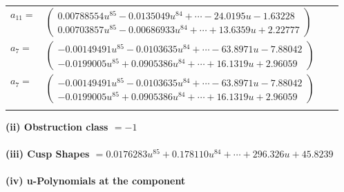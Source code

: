 \documentclass[1p]{elsarticle_modified}
\theoremstyle{definition}
\begin{document}
\begin{tabular}{m{7pt} m{180pt} m{7pt} m{180pt} }
\flushright $a_{11}=$&$\begin{pmatrix}0.00788554 u^{85}-0.0135049 u^{84}+\cdots-24.0195 u-1.63228\\0.00703857 u^{85}-0.00686933 u^{84}+\cdots+13.6359 u+2.22777\end{pmatrix}$ \\
\flushright $a_{7}=$&$\begin{pmatrix}-0.00149491 u^{85}-0.0103635 u^{84}+\cdots-63.8971 u-7.88042\\-0.0199005 u^{85}+0.0905386 u^{84}+\cdots+16.1319 u+2.96059\end{pmatrix}$\\ \flushright $a_{7}=$&$\begin{pmatrix}-0.00149491 u^{85}-0.0103635 u^{84}+\cdots-63.8971 u-7.88042\\-0.0199005 u^{85}+0.0905386 u^{84}+\cdots+16.1319 u+2.96059\end{pmatrix}$\\&\end{tabular}
\flushleft \textbf{(ii) Obstruction class $= -1$}\\~\\
\flushleft \textbf{(iii) Cusp Shapes $= 0.0176283 u^{85}+0.178110 u^{84}+\cdots+296.326 u+45.8239$}\\~\\
\newpage\renewcommand{\arraystretch}{1}
\flushleft \textbf{(iv) u-Polynomials at the component}\newline \\
\end{document}
